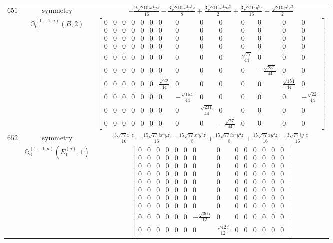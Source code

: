 \documentclass[fleqn,8pt,landscape]{jsarticle}
\begin{document}
\begin{longtable}{ccc}
$ 651 $ & $ \text{symmetry} $ & $ - \frac{9 \sqrt{210} x^{4} y z}{16} - \frac{3 \sqrt{210} x^{2} y^{3} z}{8} + \frac{3 \sqrt{210} x^{2} y z^{3}}{2} + \frac{3 \sqrt{210} y^{5} z}{16} - \frac{\sqrt{210} y^{3} z^{3}}{2} $ \\
$  $ & $ \mathbb{G}_{6}^{(1,-1;a)}(B,2) $ & $ \begin{bmatrix} 0 & 0 & 0 & 0 & 0 & 0 & 0 & 0 & 0 & 0 & 0 & 0 & 0 & 0 \\ 0 & 0 & 0 & 0 & 0 & 0 & 0 & 0 & 0 & 0 & 0 & 0 & 0 & 0 \\ 0 & 0 & 0 & 0 & 0 & 0 & 0 & 0 & 0 & 0 & 0 & 0 & 0 & 0 \\ 0 & 0 & 0 & 0 & 0 & 0 & 0 & 0 & 0 & 0 & 0 & 0 & 0 & 0 \\ 0 & 0 & 0 & 0 & 0 & 0 & 0 & 0 & 0 & 0 & \frac{\sqrt{77}}{44} & 0 & 0 & 0 \\ 0 & 0 & 0 & 0 & 0 & 0 & 0 & 0 & 0 & 0 & 0 & - \frac{\sqrt{231}}{44} & 0 & 0 \\ 0 & 0 & 0 & 0 & 0 & 0 & \frac{\sqrt{22}}{44} & 0 & 0 & 0 & 0 & 0 & \frac{\sqrt{154}}{44} & 0 \\ 0 & 0 & 0 & 0 & 0 & 0 & 0 & - \frac{\sqrt{154}}{44} & 0 & 0 & 0 & 0 & 0 & - \frac{\sqrt{22}}{44} \\ 0 & 0 & 0 & 0 & 0 & 0 & 0 & 0 & \frac{\sqrt{231}}{44} & 0 & 0 & 0 & 0 & 0 \\ 0 & 0 & 0 & 0 & 0 & 0 & 0 & 0 & 0 & - \frac{\sqrt{77}}{44} & 0 & 0 & 0 & 0 \end{bmatrix} $ \\ \hline
$ 652 $ & $ \text{symmetry} $ & $ \frac{3 \sqrt{77} x^{5} z}{16} - \frac{15 \sqrt{77} i x^{4} y z}{16} - \frac{15 \sqrt{77} x^{3} y^{2} z}{8} + \frac{15 \sqrt{77} i x^{2} y^{3} z}{8} + \frac{15 \sqrt{77} x y^{4} z}{16} - \frac{3 \sqrt{77} i y^{5} z}{16} $ \\
$  $ & $ \mathbb{G}_{6}^{(1,-1;a)}(E_{1}^{(a)},1) $ & $ \begin{bmatrix} 0 & 0 & 0 & 0 & 0 & 0 & 0 & 0 & 0 & 0 & 0 & 0 & 0 & 0 \\ 0 & 0 & 0 & 0 & 0 & 0 & 0 & 0 & 0 & 0 & 0 & 0 & 0 & 0 \\ 0 & 0 & 0 & 0 & 0 & 0 & 0 & 0 & 0 & 0 & 0 & 0 & 0 & 0 \\ 0 & 0 & 0 & 0 & 0 & 0 & 0 & 0 & 0 & 0 & 0 & 0 & 0 & 0 \\ 0 & 0 & 0 & 0 & 0 & 0 & 0 & 0 & 0 & 0 & 0 & 0 & 0 & 0 \\ 0 & 0 & 0 & 0 & 0 & 0 & 0 & 0 & 0 & 0 & 0 & 0 & 0 & 0 \\ 0 & 0 & 0 & 0 & 0 & 0 & 0 & 0 & 0 & 0 & 0 & 0 & 0 & 0 \\ 0 & 0 & 0 & 0 & 0 & 0 & 0 & 0 & 0 & 0 & 0 & 0 & 0 & 0 \\ 0 & 0 & 0 & 0 & 0 & 0 & - \frac{\sqrt{30} i}{12} & 0 & 0 & 0 & 0 & 0 & 0 & 0 \\ 0 & 0 & 0 & 0 & 0 & 0 & 0 & \frac{\sqrt{42} i}{12} & 0 & 0 & 0 & 0 & 0 & 0 \end{bmatrix} $ \\ \hline

\end{longtable}
\end{document}
